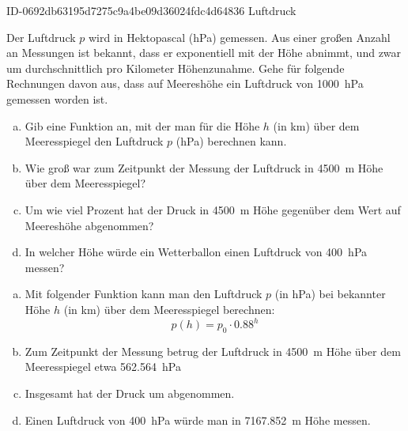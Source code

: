 \begin{exercise}
      {ID-0692db63195d7275c9a4be09d36024fdc4d64836}
      {Luftdruck}
  \ifproblem\problem\par
    Der Luftdruck $p$ wird in Hektopascal (\si{\hecto\pascal})
    gemessen. Aus einer großen Anzahl an Messungen ist bekannt,
    dass er exponentiell mit der Höhe abnimmt, und zwar um
    durchschnittlich  pro Kilometer Höhenzunahme. Gehe
    für folgende Rechnungen davon aus, dass auf Meereshöhe ein
    Luftdruck von \SI{1000}{\hecto\pascal} gemessen worden ist.
    \begin{enumerate}[a)]
      \item Gib eine Funktion an, mit der man für die Höhe $h$
            (in \si{\kilo\metre}) über dem Meeresspiegel den
            Luftdruck $p$ (\si{\hecto\pascal}) berechnen kann.
      \item Wie groß war zum Zeitpunkt der Messung der Luftdruck
            in \SI{4500}{\metre} Höhe über dem Meeresspiegel?
      \item Um wie viel Prozent hat der Druck in \SI{4500}{\metre}
            Höhe gegenüber dem Wert auf Meereshöhe abgenommen?
      \item In welcher Höhe würde ein Wetterballon einen Luftdruck
            von \SI{400}{\hecto\pascal} messen?
    \end{enumerate}
  \fi
  \ifoutcome\outcome\par
    \begin{enumerate}[a)]
      \item Mit folgender Funktion kann man den Luftdruck $p$
            (in \si{\hecto\pascal}) bei bekannter Höhe $h$
            (in \si{\kilo\metre}) über dem Meeresspiegel
            berechnen:
            \begin{equation*}
              p(h)=p_{0}\cdot\num{0.88}^{h}
            \end{equation*}
      \item Zum Zeitpunkt der Messung betrug der Luftdruck in
            \SI{4500}{\metre} Höhe über dem Meeresspiegel etwa
            \SI{562.564}{\hecto\pascal}
      \item Insgesamt hat der Druck um  abgenommen.
      \item Einen Luftdruck von \SI{400}{\hecto\pascal} würde man
            in \SI{7167.852}{\metre} Höhe messen.
    \end{enumerate}
  \fi
\end{exercise}
